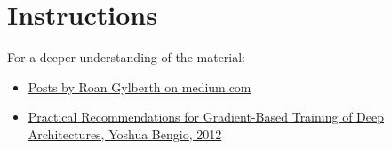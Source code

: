 \def\pathToRoot{../../}


 \def\issolution{}




\section*{Instructions}

For a deeper understanding of the material:
\begin{itemize}
	\item \href{https://medium.com/@rgylberth}{Posts by Roan Gylberth on medium.com}
	\item \href{https://arxiv.org/pdf/1206.5533.pdf}{Practical Recommendations for Gradient-Based Training of Deep Architectures, Yoshua Bengio, 2012}
\end{itemize}


